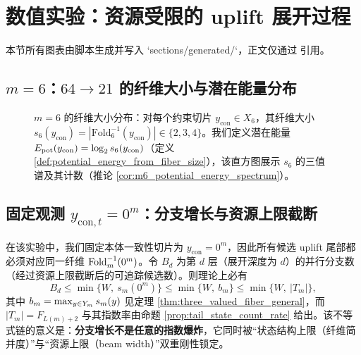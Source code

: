 \section{数值实验：资源受限的 uplift 展开过程}

本节所有图表由脚本生成并写入 `sections/generated/`，正文仅通过 \verb|| 引用。

\subsection{\texorpdfstring{$m=6$}{m=6}：\texorpdfstring{$64\to 21$}{64->21} 的纤维大小与潜在能量分布}
\begin{figure}[H]
\centering

\caption{\(m=6\) 的纤维大小分布：对每个约束切片 \(y_{\mathrm{con}}\in X_6\)，其纤维大小 \(s_6(y_{\mathrm{con}})=|\mathrm{Fold}_6^{-1}(y_{\mathrm{con}})|\in\{2,3,4\}\)。我们定义潜在能量 \(E_{\mathrm{pot}}(y_{\mathrm{con}})=\log_2 s_6(y_{\mathrm{con}})\)（定义 \ref{def:potential_energy_from_fiber_size}），该直方图展示 \(s_6\) 的三值谱及其计数（推论 \ref{cor:m6_potential_energy_spectrum}）。}
\label{fig:m6_fiber_potential_energy_hist}
\end{figure}

\begin{table}[H]
\centering
\small
\setlength{\tabcolsep}{6pt}

\caption{\(m=6\) 下每个约束切片 \(y_{\mathrm{con}}\) 的 Zeckendorf 值 \(V(y_{\mathrm{con}})\)、纤维大小 \(s_6(y_{\mathrm{con}})\) 与潜在能量 \(\Energy_{\mathrm{pot}}(y_{\mathrm{con}})\)（由脚本枚举 \(N\in\{0,\dots,63\}\) 生成）。}
\label{tab:m6_fiber_potential_energy}
\end{table}

\subsection{固定观测 \texorpdfstring{$y_{\mathrm{con},t}=0^m$}{y_con=0^m}：分支增长与资源上限截断}
在该实验中，我们固定本体一致性切片为 \(y_{\mathrm{con}}=0^m\)，因此所有候选 uplift 尾部都必须对应同一纤维 \(\mathrm{Fold}_m^{-1}(0^m)\)。令 \(B_d\) 为第 \(d\) 层（展开深度为 \(d\)）的并行分支数（经过资源上限截断后的可追踪候选数）。则理论上必有
$$
B_d \le \min\{W,\ s_m(0^m)\}\le \min\{W,\ b_m\}\le \min\{W,\ |T_m|\},
$$
其中 \(b_m=\max_{y\in Y_m}s_m(y)\) 见定理 \ref{thm:three_valued_fiber_general}，而 \(|T_m|=F_{L(m)+2}\) 与其指数率由命题 \ref{prop:tail_state_count_rate} 给出。该不等式链的意义是：\textbf{分支增长不是任意的指数爆炸}，它同时被“状态结构上限（纤维简并度）”与“资源上限（beam width）”双重刚性锁定。

